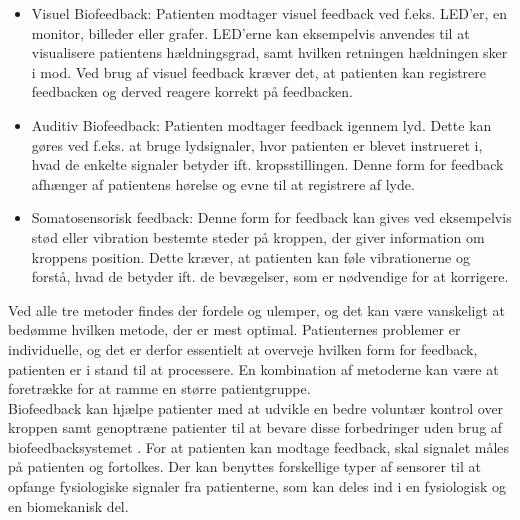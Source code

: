 \begin{itemize}
\item Visuel Biofeedback: Patienten modtager visuel feedback ved f.eks. LED'er, en monitor, billeder eller grafer. LED'erne kan eksempelvis anvendes til at visualisere patientens hældningsgrad, samt hvilken retningen hældningen sker i mod.
Ved brug af visuel feedback kræver det, at patienten kan registrere feedbacken og derved reagere korrekt på feedbacken.  \cite{webster2009,Blanchard1972}  

\item Auditiv Biofeedback: Patienten modtager feedback igennem lyd. Dette kan gøres ved f.eks. at bruge lydsignaler, hvor patienten er blevet instrueret i, hvad de enkelte signaler betyder ift. kropsstillingen. Denne form for feedback afhænger af patientens hørelse og evne til at registrere af lyde. \cite{webster2009,Blanchard1972} %

\item Somatosensorisk feedback: Denne form for feedback kan gives ved eksempelvis stød eller vibration bestemte steder på kroppen, der giver information om kroppens position. Dette kræver, at patienten kan føle vibrationerne og forstå, hvad de betyder ift. de bevægelser, som er nødvendige for at korrigere. \cite{Blanchard1972}           
\end{itemize}
 
\noindent Ved alle tre metoder findes der fordele og ulemper, og det kan være vanskeligt at bedømme hvilken metode, der er mest optimal. Patienternes problemer er individuelle, og det er derfor essentielt at overveje hvilken form for feedback, patienten er i stand til at processere. En kombination af metoderne kan være at foretrække for at ramme en større patientgruppe. \\ 
Biofeedback kan hjælpe patienter med at udvikle en bedre voluntær kontrol over kroppen samt genoptræne patienter til at bevare disse forbedringer uden brug af biofeedbacksystemet \cite{Prentice2007}. For at patienten kan modtage feedback, skal signalet måles på patienten og fortolkes. Der kan benyttes forskellige typer af sensorer til at opfange fysiologiske signaler fra patienterne, som kan deles ind i en fysiologisk og en biomekanisk del. \cite{Giggins2013}

